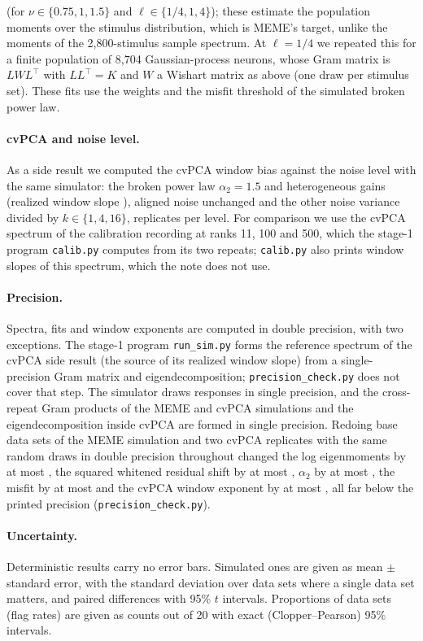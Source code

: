 \documentclass[11pt]{article}
\theoremstyle{definition}
\begin{document}
(for $\nu \in \{0.75, 1, 1.5\}$ and $\ell \in \{1/4, 1, 4\}$); these estimate the population moments over the stimulus distribution, which is MEME's target, unlike the moments of the 2,800-stimulus sample spectrum. At $\ell = 1/4$ we repeated this for a finite population of 8,704 Gaussian-process neurons, whose Gram matrix is $L W L^{\top}$ with $L L^{\top} = K$ and $W$ a Wishart matrix as above (one draw per stimulus set). These fits use the weights and the misfit threshold of the simulated broken power law.

\paragraph{cvPCA and noise level.} As a side result we computed the cvPCA window bias against the noise level with the same simulator: the broken power law $\alpha_2 = 1.5$ and heterogeneous gains (realized window slope \SnrTruth{}), aligned noise unchanged and the other noise variance divided by $k \in \{1, 4, 16\}$, \SnrR{} replicates per level. For comparison we use the cvPCA spectrum of the calibration recording at ranks 11, 100 and 500, which the stage-1 program \texttt{calib.py} computes from its two repeats; \texttt{calib.py} also prints window slopes of this spectrum, which the note does not use.

\paragraph{Precision.} Spectra, fits and window exponents are computed in double precision, with two exceptions. The stage-1 program \texttt{run\_sim.py} forms the reference spectrum of the cvPCA side result (the source of its realized window slope) from a single-precision Gram matrix and eigendecomposition; \texttt{precision\_check.py} does not cover that step. The simulator draws responses in single precision, and the cross-repeat Gram products of the MEME and cvPCA simulations and the eigendecomposition inside cvPCA are formed in single precision. Redoing \PrecN{} base data sets of the MEME simulation and two cvPCA replicates with the same random draws in double precision throughout changed the log eigenmoments by at most \PrecLogMomMax{}, the squared whitened residual shift by at most \PrecWhiteMax{}, $\alpha_2$ by at most \PrecAlphaMax{}, the misfit by at most \PrecMisfitMax{} and the cvPCA window exponent by at most \PrecCvMax{}, all far below the printed precision (\texttt{precision\_check.py}).

\paragraph{Uncertainty.} Deterministic results carry no error bars. Simulated ones are given as mean $\pm$ standard error, with the standard deviation over data sets where a single data set matters, and paired differences with 95\% $t$ intervals. Proportions of data sets (flag rates) are given as counts out of 20 with exact (Clopper--Pearson) 95\% intervals.
\end{document}

